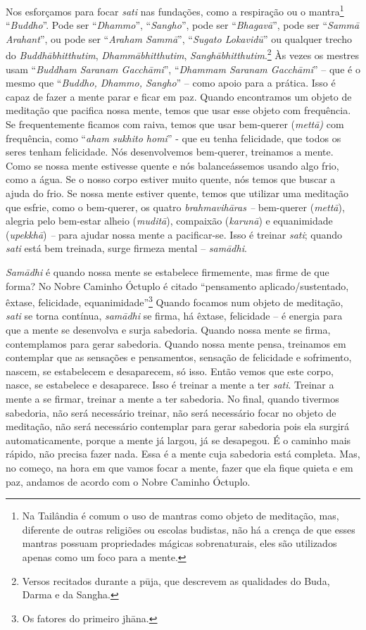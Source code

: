 Nos esforçamos para focar \textit{sati} nas fundações, como a
respiração ou o mantra\footnote{Na Tailândia é comum o uso de mantras
como objeto de meditação, mas, diferente de outras religiões ou escolas
budistas, não há a crença de que esses mantras possuam propriedades
mágicas sobrenaturais, eles são utilizados apenas como um foco para a
mente.} “\textit{Buddho}”. Pode ser “\textit{Dhammo}”,
“\textit{Sangho}”, pode ser “\textit{Bhagavā}”, pode ser
“\textit{Sammā Arahant}”, ou pode ser “\textit{Araham Sammā}”,
“\textit{Sugato Lokavidū}” ou qualquer trecho do
\textit{Buddhābhitthutim}, \textit{Dhammābhitthutim},
\textit{Sanghābhitthutim}.\footnote{Versos recitados durante a pūja,
que descrevem as qualidades do Buda, Darma e da Sangha.} Às vezes os
mestres usam “\textit{Buddham Saranam Gacchāmi}”, “\textit{Dhammam
Saranam Gacchāmi}” – que é o mesmo que “\textit{Buddho, Dhammo,
Sangho}” – como apoio para a prática. Isso é capaz de fazer a mente
parar e ficar em paz. Quando encontramos um objeto de meditação que
pacifica nossa mente, temos que usar esse objeto com frequência. Se
frequentemente ficamos com raiva, temos que usar bem-querer
(\textit{mettā)} com frequência, como “\textit{aham sukhito homi}” -
que eu tenha felicidade, que todos os seres tenham felicidade. Nós
desenvolvemos bem-querer, treinamos a mente. Como se nossa mente
estivesse quente e nós balanceássemos usando algo frio, como a água. Se
o nosso corpo estiver muito quente, nós temos que buscar a ajuda do
frio. Se nossa mente estiver quente, temos que utilizar uma meditação
que esfrie, como o bem-querer, os quatro \textit{brahmavihāras –}
bem-querer (\textit{mettā}), alegria pelo bem-estar alheio
(\textit{muditā}), compaixão (\textit{karunā}) e equanimidade
(\textit{upekkhā})\textit{ –} para ajudar nossa mente a pacificar-se.
Isso é treinar \textit{sati}; quando \textit{sati} está bem treinada,
surge firmeza mental – \textit{samādhi}. 

\textit{Samādhi} é quando nossa mente se estabelece firmemente,
mas firme de que forma? No Nobre Caminho Óctuplo é citado “pensamento
aplicado/sustentado, êxtase, felicidade, equanimidade”\footnote{Os
fatores do primeiro jhāna.} Quando focamos num objeto de meditação,
\textit{sati} se torna contínua, \textit{samādhi} se firma, há
êxtase, felicidade – é energia para que a mente se desenvolva e surja
sabedoria. Quando nossa mente se firma, contemplamos para gerar
sabedoria. Quando nossa mente pensa, treinamos em contemplar que as
sensações e pensamentos, sensação de felicidade e sofrimento, nascem,
se estabelecem e desaparecem, só isso. Então vemos que este corpo,
nasce, se estabelece e desaparece. Isso é treinar a mente a ter
\textit{sati}. Treinar a mente a se firmar, treinar a mente a ter
sabedoria. No final, quando tivermos sabedoria, não será necessário
treinar, não será necessário focar no objeto de meditação, não será
necessário contemplar para gerar sabedoria pois ela surgirá
automaticamente, porque a mente já largou, já se desapegou. É o caminho
mais rápido, não precisa fazer nada. Essa é a mente cuja sabedoria está
completa. Mas, no começo, na hora em que vamos focar a mente, fazer que
ela fique quieta e em paz, andamos de acordo com o Nobre Caminho
Óctuplo. 

